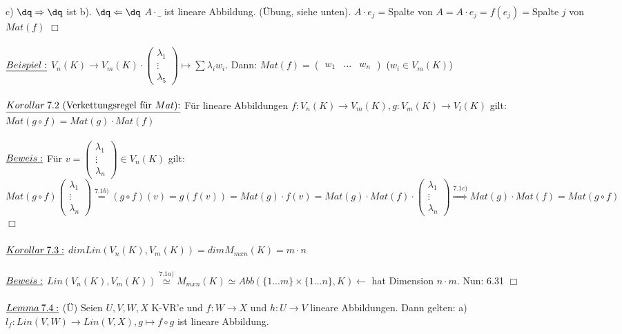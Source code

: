 \documentclass[fleqn, a4paper, 11pt]{article}
\begin{document}
c) $\dq\Rightarrow\dq$ ist b). $\dq\Leftarrow\dq$ $A\cdot\_$ ist lineare Abbildung. (Übung, siehe unten). $A\cdot e_j=$Spalte von $A=A\cdot e_j=f(e_j)=$Spalte $j$ von $Mat(f)$ \hfill $\Box$\\
\\
$\uline{Beispiel:}$ $V_n(K)\rightarrow V_m(K)\cdot\begin{pmatrix}
	\lambda_1\\
	\vdots\\
	\lambda_5
\end{pmatrix} \mapsto\sum\lambda_i w_i$. Dann: $Mat(f)=\begin{pmatrix}
	w_1 & \dots & w_n
\end{pmatrix}$ ($w_i\in V_m(K)$)\\
\\
$\uline{Korollar\:7.2\text{ (Verkettungsregel f\"ur $Mat$):}}$ F\"ur lineare Abbildungen $f:V_n(K)\rightarrow V_m(K),g:V_m(K)\rightarrow V_l(K)$ gilt: $Mat(g\circ f)=Mat(g)\cdot Mat(f)$\\
\\
$\uline{Beweis:}$ F\"ur $v=\begin{pmatrix}
	\lambda_1\\
	\vdots\\
	\lambda_n
\end{pmatrix}\in V_n(K)$ gilt: $Mat(g\circ f)\begin{pmatrix}
	\lambda_1\\
	\vdots\\
	\lambda_n
\end{pmatrix}\stackrel{7.1b)}{=}(g\circ f)(v)=g(f(v))=Mat(g)\cdot f(v)=Mat(g)\cdot Mat(f)\cdot\begin{pmatrix}
	\lambda_1\\
	\vdots\\
	\lambda_n
\end{pmatrix}\stackrel{7.1c)}{\Rightarrow} Mat(g)\cdot Mat(f)=Mat(g\circ f)$ \hfill $\Box$\\
\\
$\uline{Korollar\:7.3:}$ $dim Lin(V_n(K),V_m(K))=dim M_{mxn}(K)=m\cdot n$\\
\\
$\uline{Beweis:}$ $Lin(V_n(K),V_m(K))\stackrel{7.1a)}{\simeq}M_{mxn}(K)\simeq Abb(\{1...m\}\times\{1...n\},K)\leftarrow$ hat Dimension $n\cdot m$. Nun: 6.31 \hfill $\Box$\\
\\
$\uline{Lemma\:7.4:}$ (\"U) Seien $U,V,W,X$ K-VR'e und $f:W\rightarrow X$ und $h:U\rightarrow V$ lineare Abbildungen. Dann gelten: a) $l_f:Lin(V,W)\rightarrow Lin(V,X),g\mapsto f\circ g$ ist lineare Abbildung.\\
\end{document}
